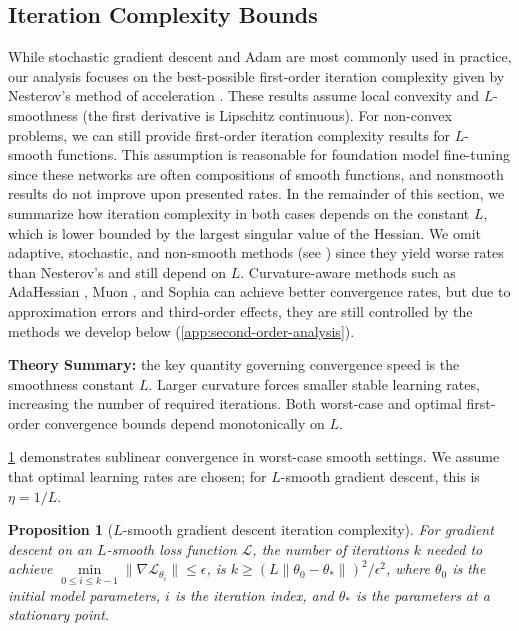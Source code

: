 \documentclass{article}
\theoremstyle{plain}
\newtheorem{proposition}[theorem]{Proposition}
\theoremstyle{definition}
\theoremstyle{remark}
\begin{document}
\subsection{Iteration Complexity Bounds}
While stochastic gradient descent and Adam are most commonly used in practice, our analysis focuses on the best-possible first-order iteration complexity given by Nesterov's method of acceleration \citep{nesterov2013introductory}. These results assume local convexity and $L$-smoothness (the first derivative is Lipschitz continuous). For non-convex problems, we can still provide first-order iteration complexity results for $L$-smooth functions. This assumption is reasonable for foundation model fine-tuning since these networks are often compositions of smooth functions, and nonsmooth results do not improve upon presented rates. In the remainder of this section, we summarize how iteration complexity in both cases depends on the constant $L$, which is lower bounded by the largest singular value of the Hessian. We omit adaptive, stochastic, and non-smooth methods (see \citealp{Wright_Recht_2022,de2018convergence, dfossez2022a}) since they yield worse rates than Nesterov's and still depend on $L$. Curvature-aware methods such as AdaHessian \citep{yao2021adahessian}, Muon \citep{jordan2024muon}, and Sophia \citep{liusophia} can achieve better convergence rates, but due to approximation errors and third-order effects, they are still controlled by the methods we develop below (\cref{app:second-order-analysis}).

\textbf{Theory Summary:} the key quantity governing convergence speed is the smoothness constant $L$. Larger curvature forces smaller stable learning rates, increasing the number of required iterations. Both worst-case and optimal first-order convergence bounds depend monotonically on $L$.

\cref{prop:l-smooth-descent-iteration} demonstrates sublinear convergence in worst-case smooth settings. We assume that optimal learning rates are chosen; for $L$-smooth gradient descent, this is $\eta = 1/L$.

\begin{proposition}[$L$-smooth gradient descent iteration complexity]
\label{prop:l-smooth-descent-iteration}
For gradient descent on an $L$-smooth loss function $\mathcal{L}$, the number of iterations $k$ needed to achieve $\underset{0 \leq i \leq k-1}{\min} \|\nabla \mathcal{L}_{\theta_i}\| \le \epsilon$, is \(
 k \ge ( L\|\theta_0 - \theta_*\| )^2/\epsilon^2
\), where $\theta_0$ is the initial model parameters, $i$ is the iteration index, and $\theta_*$ is the parameters at a stationary point.
\end{proposition}
\end{document}
